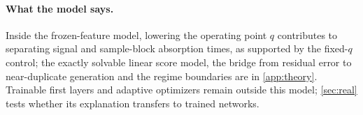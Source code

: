 \paragraph{What the model says.}\label{sec:theory-linear}\label{sec:theory-predictor}
Inside the frozen-feature model, lowering the operating point $q$ contributes to separating signal and sample-block absorption times, as supported by the fixed-$q$ control; the exactly solvable linear score model, the bridge from residual error to near-duplicate generation and the regime boundaries are in \cref{app:theory}. Trainable first layers and adaptive optimizers remain outside this model; \cref{sec:real} tests whether its explanation transfers to trained networks.
